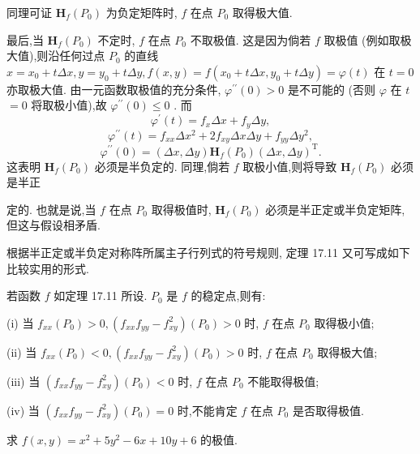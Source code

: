 同理可证 \({\mathbf{H}}_{f}\left( {P}_{0}\right)\) 为负定矩阵时, \(f\) 在点 \({P}_{0}\) 取得极大值.

最后,当 \({\mathbf{H}}_{f}\left( {P}_{0}\right)\) 不定时, \(f\) 在点 \({P}_{0}\) 不取极值. 这是因为倘若 \(f\) 取极值 (例如取极大值),则沿任何过点 \({P}_{0}\) 的直线 \(x = {x}_{0} + {t\Delta x},y = {y}_{0} + {t\Delta y},f\left( {x,y}\right)  = f\left( {{x}_{0} + {t\Delta x},{y}_{0} + {t\Delta y}}\right)  = \varphi \left( t\right)\) 在 \(t = 0\) 亦取极大值. 由一元函数取极值的充分条件, \({\varphi }^{\prime \prime }\left( 0\right)  > 0\) 是不可能的 (否则 \(\varphi\) 在 \(t\)  \(= 0\) 将取极小值),故 \({\varphi }^{\prime \prime }\left( 0\right)  \leq  0\) . 而
\[
{\varphi }^{\prime }\left( t\right)  = {f}_{x}{\Delta x} + {f}_{y}{\Delta y},
\]
\[
{\varphi }^{\prime \prime }\left( t\right)  = {f}_{xx}\Delta {x}^{2} + 2{f}_{xy}{\Delta x\Delta y} + {f}_{yy}\Delta {y}^{2},
\]
\[
{\varphi }^{\prime \prime }\left( 0\right)  = \left( {{\Delta x},{\Delta y}}\right) {\mathbf{H}}_{f}\left( {P}_{0}\right) {\left( \Delta x,\Delta y\right) }^{\mathrm{T}}.
\]
这表明 \({\mathbf{H}}_{f}\left( {P}_{0}\right)\) 必须是半负定的. 同理,倘若 \(f\) 取极小值,则将导致 \({\mathbf{H}}_{f}\left( {P}_{0}\right)\) 必须是半正

定的. 也就是说,当 \(f\) 在点 \({P}_{0}\) 取得极值时, \({\mathbf{H}}_{f}\left( {P}_{0}\right)\) 必须是半正定或半负定矩阵,但这与假设相矛盾.

根据半正定或半负定对称阵所属主子行列式的符号规则, 定理 17.11 又可写成如下比较实用的形式.

若函数 \(f\) 如定理 17.11 所设. \({P}_{0}\) 是 \(f\) 的稳定点,则有:

(i) 当 \({f}_{xx}\left( {P}_{0}\right)  > 0,\left( {{f}_{xx}{f}_{yy} - {f}_{xy}^{2}}\right) \left( {P}_{0}\right)  > 0\) 时, \(f\) 在点 \({P}_{0}\) 取得极小值;

(ii) 当 \({f}_{xx}\left( {P}_{0}\right)  < 0,\left( {{f}_{xx}{f}_{yy} - {f}_{xy}^{2}}\right) \left( {P}_{0}\right)  > 0\) 时, \(f\) 在点 \({P}_{0}\) 取得极大值;

(iii) 当 \(\left( {{f}_{xx}{f}_{yy} - {f}_{xy}^{2}}\right) \left( {P}_{0}\right)  < 0\) 时, \(f\) 在点 \({P}_{0}\) 不能取得极值;

(iv) 当 \(\left( {{f}_{xx}{f}_{yy} - {f}_{xy}^{2}}\right) \left( {P}_{0}\right)  = 0\) 时,不能肯定 \(f\) 在点 \({P}_{0}\) 是否取得极值.

\begin{example}

\end{example}
求 \(f\left( {x,y}\right)  = {x}^{2} + 5{y}^{2} - {6x} + {10y} + 6\) 的极值.

